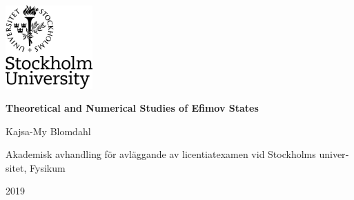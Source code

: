 \documentclass{report}
\begin{document}
\begin{titlepage}
\includegraphics[width=0.25\textwidth,right]{logga}\par\vspace{1cm}
\centering
\vspace{2.5cm}
{\Huge\bfseries Theoretical and Numerical Studies of Efimov States\par}
\vspace{2cm}
{\LARGE Kajsa-My Blomdahl\par}
\vfill
\begin{otherlanguage}{swedish} 
{\large Akademisk avhandling för avläggande av licentiatexamen vid Stockholms universitet, Fysikum\par}
\end{otherlanguage}
\vspace{1cm}
{\large 2019\par}
\end{titlepage}
\end{document}
